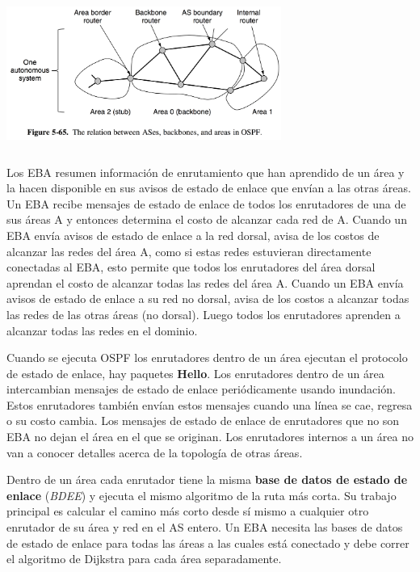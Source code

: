 	\begin{center}
			\includegraphics[width=9cm, height=5cm]{./imagenes/ospf2.png} 
		\end{center}
		
	\par Los EBA resumen información de enrutamiento que han aprendido de un área y la hacen disponible en sus avisos de estado de enlace que envían a las otras áreas. Un EBA recibe mensajes de estado de enlace de todos los enrutadores de una de sus áreas A y entonces determina el costo de alcanzar cada red de A. Cuando un EBA envía avisos de estado de enlace a la red dorsal, avisa de los costos de alcanzar las redes del área A, como si estas redes estuvieran directamente conectadas al EBA, esto permite que todos los enrutadores del área dorsal aprendan el costo de alcanzar todas las redes del área A. Cuando un EBA envía avisos de estado de enlace a su red no dorsal, avisa de los costos a alcanzar todas las redes de las otras áreas (no dorsal). Luego todos los enrutadores aprenden a alcanzar todas las redes en el dominio.
	
	\par Cuando se ejecuta OSPF los enrutadores dentro de un área ejecutan el protocolo de estado de enlace, hay paquetes \textbf{Hello}. Los enrutadores dentro de un área intercambian mensajes de estado de enlace periódicamente usando inundación. Estos enrutadores también envían estos mensajes cuando una línea se cae, regresa o su costo cambia. Los mensajes de estado de enlace de enrutadores que no son EBA no dejan el área en el que se originan. Los enrutadores internos a un área no van a conocer detalles acerca de la topología de otras áreas.

	\par Dentro de un área cada enrutador tiene la misma \textbf{base de datos de estado de enlace} (\textit{BDEE}) y ejecuta el mismo algoritmo de la ruta más corta. Su trabajo principal es calcular el camino más corto desde sí mismo a cualquier otro enrutador de su área y red en el AS entero. Un EBA necesita las bases de datos de estado de enlace para todas las áreas a las cuales está conectado y debe correr el algoritmo de Dijkstra para cada área separadamente.


